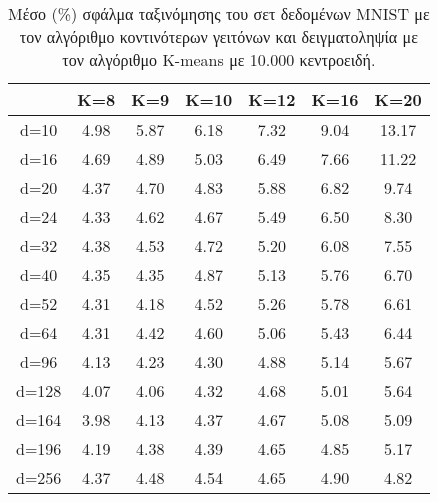 \begin{table}[H]
\singlespacing
\centering
\label{tab:table5}
\caption{Μέσο (\%) σφάλμα ταξινόμησης του σετ δεδομένων \textlatin{MNIST} με τον αλγόριθμο κοντινότερων γειτόνων και δειγματοληψία με τον αλγόριθμο \textlatin{K-means} με 10.000 κεντροειδή.}
\vspace*{5mm}
\begin{tabular}{|c|c|c|c|c|c|c|}
\hline
& K=8 & K=9 & K=10 & K=12 & K=16 & K=20 \\
\hline
d=10 & 4.98 & 5.87 & 6.18 & 7.32 & 9.04 & 13.17 \\
d=16 & 4.69 & 4.89 & 5.03 & 6.49 & 7.66 & 11.22 \\
d=20 & 4.37 & 4.70 & 4.83 & 5.88 & 6.82 & 9.74 \\
d=24 & 4.33 & 4.62 & 4.67 & 5.49 & 6.50 & 8.30 \\
d=32 & 4.38 & 4.53 & 4.72 & 5.20 & 6.08 & 7.55 \\
d=40 & 4.35 & 4.35 & 4.87 & 5.13 & 5.76 & 6.70 \\
d=52 & 4.31 & 4.18 & 4.52 & 5.26 & 5.78 & 6.61 \\
d=64 & 4.31 & 4.42 & 4.60 & 5.06 & 5.43 & 6.44 \\
d=96 & 4.13 & 4.23 & 4.30 & 4.88 & 5.14 & 5.67 \\
d=128 & 4.07 & 4.06 & 4.32 & 4.68 & 5.01 & 5.64 \\
d=164 & 3.98 & 4.13 & 4.37 & 4.67 & 5.08 & 5.09 \\
d=196 & 4.19 & 4.38 & 4.39 & 4.65 & 4.85 & 5.17 \\
d=256 & 4.37 & 4.48 & 4.54 & 4.65 & 4.90 & 4.82 \\
\hline
\end{tabular}
\end{table}

